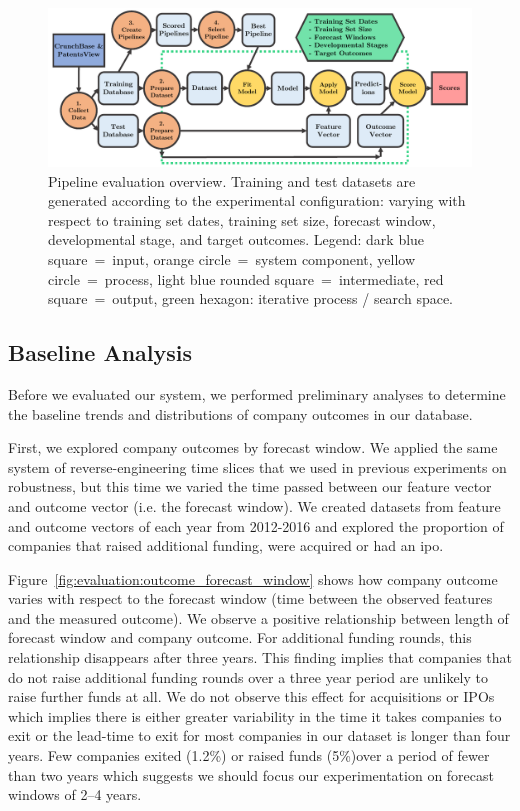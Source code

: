 \documentclass[../thesis/thesis.tex]{subfiles}
\begin{document}
\begin{figure}[!htb]
    \centering
    \includegraphics[width=\textwidth]{../figures/evaluation/flowchart_evaluation}
    \caption[Pipeline evaluation flowchart]{Pipeline evaluation overview. Training and test datasets are generated according to the experimental configuration: varying with respect to training set dates, training set size, forecast window, developmental stage, and target outcomes. Legend: dark blue square~=~input, orange circle~=~system component, yellow circle~=~process, light blue rounded square~=~intermediate, red square~=~output, green hexagon: iterative process / search space.}
    \label{fig:evaluation:pipeline_evaluation}
\end{figure}

\subsection{Baseline Analysis}

Before we evaluated our system, we performed preliminary analyses to determine the baseline trends and distributions of company outcomes in our database.

First, we explored company outcomes by forecast window. We applied the same system of reverse-engineering time slices that we used in previous experiments on robustness, but this time we varied the time passed between our feature vector and outcome vector (i.e. the forecast window). We created datasets from feature and outcome vectors of each year from 2012-2016 and explored the proportion of companies that raised additional funding, were acquired or had an \gls{ipo}.

Figure~\ref{fig:evaluation:outcome_forecast_window} shows how company outcome varies with respect to the forecast window (time between the observed features and the measured outcome). We observe a positive relationship between length of forecast window and company outcome. For additional funding rounds, this relationship disappears after three years. This finding implies that companies that do not raise additional funding rounds over a three year period are unlikely to raise further funds at all. We do not observe this effect for acquisitions or IPOs which implies there is either greater variability in the time it takes companies to exit or the lead-time to exit for most companies in our dataset is longer than four years. Few companies exited (1.2\%) or raised funds (5\%)over a period of fewer than two years which suggests we should focus our experimentation on forecast windows of 2--4 years.
\end{document}

